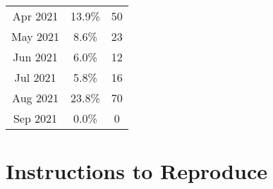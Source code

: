 \documentclass[fontsize=11pt]{article}
\begin{document}
\begin{tabular}{|c|c|c|}
        Apr 2021            & 13.9\%                               & 50                                            \\
        May 2021            & 8.6\%                                & 23                                            \\
        Jun 2021            & 6.0\%                                & 12                                            \\
        Jul 2021            & 5.8\%                                & 16                                            \\
        Aug 2021            & 23.8\%                               & 70                                            \\
        Sep 2021            & 0.0\%                                & 0                                             \\
        \hline
    \end{tabular}


    \section*{Instructions to Reproduce}
\end{document}
